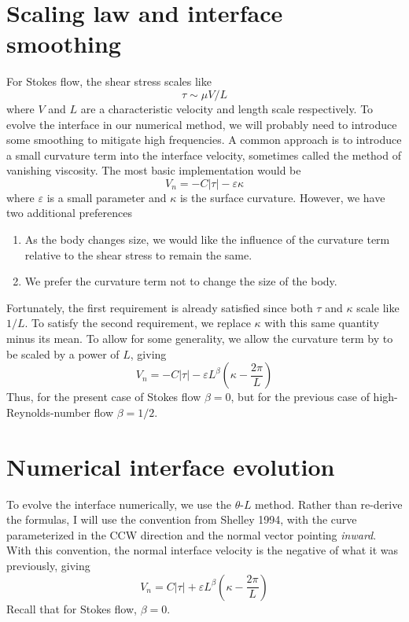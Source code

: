 \documentclass[11pt]{article}
\newcommand{\abs}[1]{\left| #1 \right|}
\newcommand{\eps}{\varepsilon}
\newcommand{\atau}{\abs{\tau}}
\begin{document}
\section{Scaling law and interface smoothing}
For Stokes flow, the shear stress scales like
\begin{equation}
\tau \sim \mu V/L
\end{equation}
where $V$ and $L$ are a characteristic velocity and length scale respectively. To evolve the interface in our numerical method, we will probably need to introduce some smoothing to mitigate high frequencies. A common approach is to introduce a small curvature term into the interface velocity, sometimes called the method of vanishing viscosity. The most basic implementation would be
\begin{equation}
V_n = - C \atau - \eps \kappa
\end{equation}
where $\eps$ is a small parameter and $\kappa$ is the surface curvature. However, we have two additional preferences
\begin{enumerate}
\item As the body changes size, we would like the influence of the curvature term relative to the shear stress to remain the same.
\item We prefer the curvature term not to change the size of the body.
\end{enumerate}
Fortunately, the first requirement is already satisfied since both $\tau$ and $\kappa$ scale like $1/L$. To satisfy the second requirement, we replace $\kappa$ with this same quantity minus its mean. To allow for some generality, we allow the curvature term by to be scaled by a power of $L$, giving
\begin{equation}
V_n = - C \atau - \eps L^{\beta} \left(\kappa - \frac{2 \pi}{L} \right)
\end{equation}
Thus, for the present case of Stokes flow $\beta=0$, but for the previous case of high-Reynolds-number flow $\beta=1/2$.

\section{Numerical interface evolution}

To evolve the interface numerically, we use the $\theta$-$L$ method. Rather than re-derive the formulas, I will use the convention from Shelley 1994, with the curve parameterized in the CCW direction and the normal vector pointing {\em inward}. With this convention, the normal interface velocity is the negative of what it was previously, giving
\begin{equation}
\label{Vn1}
V_n = C \atau + \eps L^{\beta} \left(\kappa - \frac{2 \pi}{L} \right)
\end{equation}
Recall that for Stokes flow, $\beta = 0$.
\end{document}
